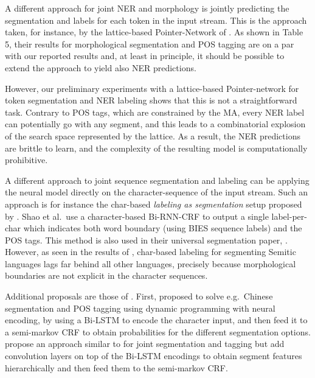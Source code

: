 \documentclass[11pt,a4paper]{article}
\begin{document}
A  different  approach  for  joint  NER  and  morphology is jointly predicting the segmentation and labels for each token in the input stream. This is the approach taken, for instance, by the lattice-based Pointer-Network of \citet{seker-tsarfaty-2020-pointer}. As shown in Table 5, their results for morphological segmentation  and  POS  tagging  are  on  a par  with our  reported  results  and,  at  least  in  principle, it should be possible to extend the \citet{seker-tsarfaty-2020-pointer} approach to yield also NER predictions. 

However, our preliminary experiments with a lattice-based Pointer-network for token segmentation and NER labeling shows that this is not a straightforward task. Contrary to POS tags, which are constrained by the MA, every NER label can potentially go with any  segment, and this leads to a combinatorial explosion of the search space represented by the lattice. As a result, the NER predictions are brittle to learn, and the complexity of the resulting model is computationally prohibitive.

A different approach to joint sequence segmentation and labeling can be  applying the neural model directly on the character-sequence of the input stream. 
Such an approach is for instance the char-based {\em labeling as segmentation} setup  proposed by \citet{shao-etal-2017-character}. Shao et al.\  use a character-based Bi-RNN-CRF to output a single label-per-char which indicates  both  word boundary (using BIES sequence labels) and the POS tags.
This method is also used in their universal segmentation paper, \cite{shao-etal-2018-universal}.
However, as seen in the results of \citet{shao-etal-2018-universal}, char-based labeling for segmenting Semitic languages lags far behind all other languages, precisely because morphological boundaries are not explicit in the character sequences. 

Additional proposals are those of \citet{kong2015segmental,kemos-etal-2019-neural}.
First, \citet{kong2015segmental} proposed to solve
 e.g.\ Chinese segmentation and POS tagging using
dynamic programming with neural encoding, by using a Bi-LSTM to encode the character input, and then feed it to a semi-markov CRF to obtain probabilities for the different segmentation options. 
\citet{kemos-etal-2019-neural} propose an approach similar to \citet{kong2015segmental} for joint segmentation and tagging but add convolution layers on top of the Bi-LSTM encodings to obtain segment features hierarchically and then feed them to the semi-markov CRF. 
\end{document}
